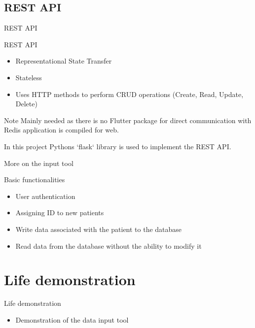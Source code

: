 \documentclass{beamer}
\begin{document}
\subsection{REST API}%

\begin{frame}{REST API}
        \begin{block}{REST API}
        \begin{itemize}
            \item Representational State Transfer
            \item Stateless
            \item Uses HTTP methods to perform CRUD operations (Create, Read, Update, Delete)
        \end{itemize}
    \end{block}
\begin{alertblock}{Note}
        Mainly needed as there is no Flutter package for direct communication with Redis application is compiled for web.
    \end{alertblock}

    \begin{block}{}
        In this project Pythons `flask` library is used to implement the REST API.
    \end{block}
\end{frame}
\begin{frame}{More on the input tool}
    \begin{block}{Basic functionalities}
        \begin{itemize}
            \item User authentication
            \item Assigning ID to new patients
            \item Write data associated with the patient to the database
            \item Read data from the database without the ability to modify it
        \end{itemize}
    \end{block}
\end{frame}

\section{Life demonstration}%
\label{sec:Life demonstration}

\begin{frame}{Life demonstration}
    \begin{block}{}
        \begin{itemize}
            \item Demonstration of the data input tool
        \end{itemize}
    \end{block}
\end{frame}
\end{document}
